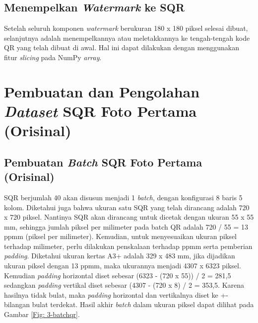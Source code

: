 \subsection{Menempelkan \emph{Watermark} ke SQR} Setelah seluruh komponen \emph{watermark} berukuran 180 x 180 piksel selesai dibuat, selanjutnya adalah menempelkannya atau meletakkannya ke
tengah-tengah kode QR yang telah dibuat di awal. Hal ini dapat dilakukan dengan menggunakan fitur \emph{slicing} pada NumPy \emph{array}.

\section{Pembuatan dan Pengolahan \emph{Dataset} SQR Foto Pertama (Orisinal)}
\subsection{Pembuatan \emph{Batch} SQR Foto Pertama (Orisinal)} \label{Pembuatan Batch SQR Foto Pertama (Orisinal)} SQR berjumlah 40 akan disusun menjadi 1 \emph{batch}, dengan konfigurasi 8
baris 5 kolom. Diketahui juga bahwa ukuran satu SQR yang telah dirancang adalah 720 x 720 piksel. Nantinya SQR akan dirancang untuk dicetak dengan ukuran 55 x
55 mm, sehingga jumlah piksel per milimeter pada batch QR adalah 720 / 55 = 13 ppmm (piksel per milimeter). Kemudian, untuk menyesuaikan ukuran piksel terhadap
milimeter, perlu dilakukan penskalaan terhadap ppmm serta pemberian \emph{padding}. Diketahui ukuran kertas A3+ adalah 329 x 483 mm, jika dijadikan ukuran
piksel dengan 13 ppmm, maka ukurannya menjadi 4307 x 6323 piksel. Kemudian \emph{padding} horizontal diset sebesar (6323 - (720 x 55)) / 2 = 281,5 sedangkan
\emph{padding} vertikal diset sebesar (4307 - (720 x 8) / 2 = 353,5. Karena hasilnya tidak bulat, maka \emph{padding} horizontal dan vertikalnya diset ke +-
bilangan bulat terdekat. Hasil akhir \emph{batch} dalam ukuran piksel dapat dilihat pada Gambar \ref{Fig: 3-batchqr}.

